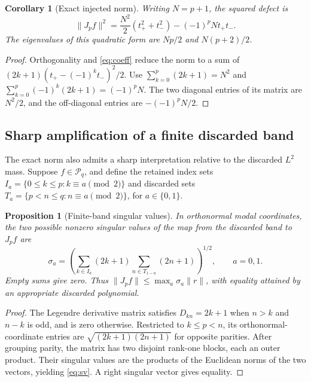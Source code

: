 \documentclass[11pt]{article}
\newtheorem{proposition}[theorem]{Proposition}
\newtheorem{corollary}[theorem]{Corollary}
\newcommand{\PP}{\mathcal P}
\newcommand{\norm}[1]{\lVert #1\rVert}
\begin{document}
\begin{corollary}[Exact injected norm]\label{cor:norm}
Writing \(N=p+1\), the squared defect is
\begin{equation}\label{eq:exactnorm}
 \norm{J_pf}^2=\frac{N^2}{2}(t_+^2+t_-^2)-(-1)^pN t_+t_-.
\end{equation}
The eigenvalues of this quadratic form are \(Np/2\) and \(N(p+2)/2\).
\end{corollary}
\begin{proof}
Orthogonality and \eqref{eq:coeff} reduce the norm to a sum of \((2k+1)(t_+-(-1)^kt_-)^2/2\). Use \(\sum_{k=0}^p(2k+1)=N^2\) and \(\sum_{k=0}^p(-1)^k(2k+1)=(-1)^pN\). The two diagonal entries of its matrix are \(N^2/2\), and the off-diagonal entries are \(-(-1)^pN/2\).
\end{proof}

\subsection{Sharp amplification of a finite discarded band}
The exact norm also admits a sharp interpretation relative to the discarded \(L^2\) mass. Suppose \(f\in\PP_q\), and define the retained index sets \(I_a=\{0\leq k\leq p:k\equiv a\pmod2\}\) and discarded sets \(T_a=\{p<n\leq q:n\equiv a\pmod2\}\), for \(a\in\{0,1\}\).

\begin{proposition}[Finite-band singular values]\label{prop:sv}
In orthonormal modal coordinates, the two possible nonzero singular values of the map from the discarded band to \(J_pf\) are
\begin{equation}\label{eq:sv}
 \sigma_a=\left(\sum_{k\in I_a}(2k+1)\sum_{n\in T_{1-a}}(2n+1)\right)^{1/2},\qquad a=0,1.
\end{equation}
Empty sums give zero. Thus \(\norm{J_pf}\leq\max_a\sigma_a\norm{r}\), with equality attained by an appropriate discarded polynomial.
\end{proposition}
\begin{proof}
The Legendre derivative matrix satisfies \(D_{kn}=2k+1\) when \(n>k\) and \(n-k\) is odd, and is zero otherwise. Restricted to \(k\leq p<n\), its orthonormal-coordinate entries are \(\sqrt{(2k+1)(2n+1)}\) for opposite parities. After grouping parity, the matrix has two disjoint rank-one blocks, each an outer product. Their singular values are the products of the Euclidean norms of the two vectors, yielding \eqref{eq:sv}. A right singular vector gives equality.
\end{proof}
\end{document}
